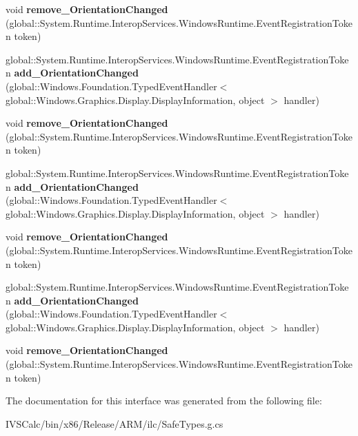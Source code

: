 \begin{DoxyCompactItemize}
void {\bfseries remove\+\_\+\+Orientation\+Changed} (global\+::\+System.\+Runtime.\+Interop\+Services.\+Windows\+Runtime.\+Event\+Registration\+Token token)
\item 
\mbox{\label{interface_windows_1_1_graphics_1_1_display_1_1_i_display_information_a5ff17c5222c1cde6f25e263c9d966e62}} 
global\+::\+System.\+Runtime.\+Interop\+Services.\+Windows\+Runtime.\+Event\+Registration\+Token {\bfseries add\+\_\+\+Orientation\+Changed} (global\+::\+Windows.\+Foundation.\+Typed\+Event\+Handler$<$ global\+::\+Windows.\+Graphics.\+Display.\+Display\+Information, object $>$ handler)
\item 
\mbox{\label{interface_windows_1_1_graphics_1_1_display_1_1_i_display_information_a3095992abe09f6bef7068bd3a5d76684}} 
void {\bfseries remove\+\_\+\+Orientation\+Changed} (global\+::\+System.\+Runtime.\+Interop\+Services.\+Windows\+Runtime.\+Event\+Registration\+Token token)
\item 
\mbox{\label{interface_windows_1_1_graphics_1_1_display_1_1_i_display_information_a5ff17c5222c1cde6f25e263c9d966e62}} 
global\+::\+System.\+Runtime.\+Interop\+Services.\+Windows\+Runtime.\+Event\+Registration\+Token {\bfseries add\+\_\+\+Orientation\+Changed} (global\+::\+Windows.\+Foundation.\+Typed\+Event\+Handler$<$ global\+::\+Windows.\+Graphics.\+Display.\+Display\+Information, object $>$ handler)
\item 
\mbox{\label{interface_windows_1_1_graphics_1_1_display_1_1_i_display_information_a3095992abe09f6bef7068bd3a5d76684}} 
void {\bfseries remove\+\_\+\+Orientation\+Changed} (global\+::\+System.\+Runtime.\+Interop\+Services.\+Windows\+Runtime.\+Event\+Registration\+Token token)
\item 
\mbox{\label{interface_windows_1_1_graphics_1_1_display_1_1_i_display_information_a5ff17c5222c1cde6f25e263c9d966e62}} 
global\+::\+System.\+Runtime.\+Interop\+Services.\+Windows\+Runtime.\+Event\+Registration\+Token {\bfseries add\+\_\+\+Orientation\+Changed} (global\+::\+Windows.\+Foundation.\+Typed\+Event\+Handler$<$ global\+::\+Windows.\+Graphics.\+Display.\+Display\+Information, object $>$ handler)
\item 
\mbox{\label{interface_windows_1_1_graphics_1_1_display_1_1_i_display_information_a3095992abe09f6bef7068bd3a5d76684}} 
void {\bfseries remove\+\_\+\+Orientation\+Changed} (global\+::\+System.\+Runtime.\+Interop\+Services.\+Windows\+Runtime.\+Event\+Registration\+Token token)
\end{DoxyCompactItemize}


The documentation for this interface was generated from the following file\+:\begin{DoxyCompactItemize}
\item 
I\+V\+S\+Calc/bin/x86/\+Release/\+A\+R\+M/ilc/Safe\+Types.\+g.\+cs\end{DoxyCompactItemize}
